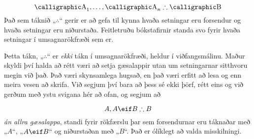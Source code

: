 
$$\meta{A}_{1}, \ldots, \meta{A}_{n} \therefore \meta{B}$$
Það sem táknið „$\therefore$“ gerir er að gefa til kynna hvaða setningar eru forsendur og hvaða setningar eru niðurstaða. Feitletruðu bókstafirnir standa svo fyrir hvaða setningar í umsagnarökfræði sem er.  


Þetta tákn, „$\therefore$“ er \emph{ekki} tákn í umsagnarökfræði, heldur í viðfangsmálinu. Maður skyldi því halda að rétt væri að setja gæsalappir utan um setningarnar sitthvoru megin við það. Það væri skynsamlega hugsað, en það væri erfitt að lesa og enn meira vesen að skrifa. Við segjum því bara að þess sé ekki þörf, rétt eins og við gerðum með ystu svigana hér að ofan, og segjum að 

$$A, A \eif B \therefore B$$
\emph{án allra gæsalappa}, standi fyrir rökfærslu þar sem forsendurnar eru táknaðar með „$A$“, „$A\eif B$“ og niðurstaðan með „$B$“. Það er ólíklegt að valda misskilningi.
